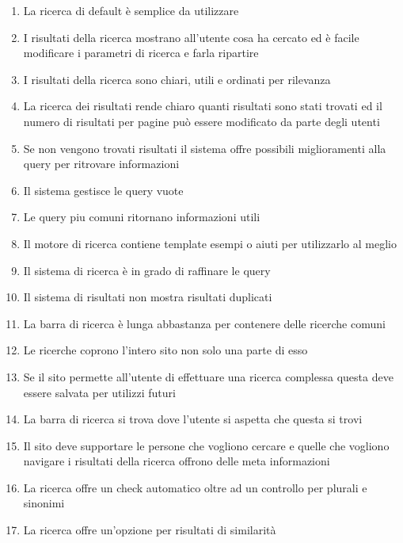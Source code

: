\documentclass[../Report.tex]{subfiles}
\begin{document}
    \begin{enumerate}
        \item La ricerca di default è semplice da utilizzare 
        \item I risultati della ricerca mostrano all’utente cosa ha cercato ed è facile modificare i parametri di ricerca e farla ripartire 
        \item I risultati della ricerca sono chiari, utili e ordinati per rilevanza
        \item La ricerca dei risultati rende chiaro quanti risultati sono stati trovati ed il numero di risultati per pagine può essere modificato da parte degli utenti 
        \item Se non vengono trovati risultati il sistema offre possibili miglioramenti alla query per ritrovare informazioni 
        \item Il sistema gestisce le query vuote
        \item Le query piu comuni ritornano informazioni utili 
        \item Il motore di ricerca contiene template esempi o aiuti per utilizzarlo al meglio 
        \item Il sistema di ricerca è in grado di raffinare le query
        \item Il sistema di risultati non mostra risultati duplicati 
        \item La barra di ricerca è lunga abbastanza per contenere delle ricerche comuni
        \item Le ricerche coprono l’intero sito non solo una parte di esso 
        \item Se il sito permette all’utente di effettuare una ricerca complessa questa deve essere salvata per utilizzi futuri 
        \item La barra di ricerca si trova dove l’utente si aspetta che questa si trovi 
        \item Il sito deve supportare le persone che vogliono cercare e quelle che vogliono navigare 
        i risultati della ricerca offrono delle meta informazioni
        \item La ricerca offre un check automatico oltre ad un controllo per plurali e sinonimi 
        \item La ricerca offre un’opzione per risultati di similarità
        
    \end{enumerate}
\end{document}
